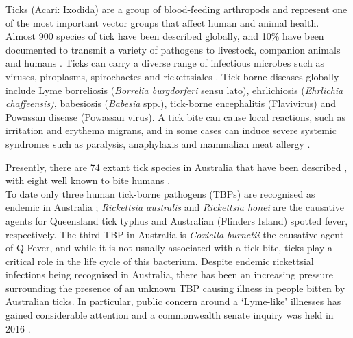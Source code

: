 \documentclass[a4paper, nobind]{templates/ociamthesis}
\begin{document}
\nocite{guglielmoneIxodidaeAcariIxodoidea2020}
\nocite{lohIdentificationTheileriaFuliginosalike2018}
\nocite{cooperDetectionCoxiellaBurnetii2013} \nocite{greayIlluminatingBacterialMicrobiome2021} \nocite{brodyCaseTickTyphus1946} \nocite{popeIsolationRickettsiaResembling1955} \nocite{owenDetectionIdentificationNovel2006} \nocite{owenPotentiallyPathogenicSpotted2006} \nocite{sentausaGenomeSequenceRickettsia2013} \nocite{liHighPrevalenceRickettsia2010} \nocite{abdadRickettsiaGravesiiSp2017} \nocite{owenDetectionCharacterisationRickettsiae2007} \nocite{bennettCoxiellaBurnetiiWestern2011}
\nocite{jefferiesTwoSpeciesCanine2003}
\nocite{jonssonProductivityHealthEffects2008}
\nocite{angusHistoryCattleTick1996}

Ticks (Acari: Ixodida) are a group of blood-feeding arthropods and represent one of the most important vector groups that affect human and animal health. Almost 900 species of tick have been described globally, and 10\% have been documented to transmit a variety of pathogens to livestock, companion animals and humans \autocite{jongejanGlobalImportanceTicks2004}.
Ticks can carry a diverse range of infectious microbes such as viruses, piroplasms, spirochaetes and rickettsiales \autocite{pfaffleEcologyTickborneDiseases2013}.
Tick-borne diseases globally include Lyme borreliosis (\emph{Borrelia burgdorferi} sensu lato), ehrlichiosis (\emph{Ehrlichia chaffeensis)}, babesiosis (\emph{Babesia} spp.), tick-borne encephalitis (Flavivirus) and Powassan disease (Powassan virus).
A tick bite can cause local reactions, such as irritation and erythema migrans, and in some cases can induce severe systemic syndromes such as paralysis, anaphylaxis and mammalian meat allergy \autocite{vannunenTickinducedAllergiesMammalian2015,beamanNoninfectiousIllnessTick2018,pienaarTickParalysisSolving2018}.

Presently, there are 74 extant tick species in Australia that have been described \autocite{barkerList70Species2014,ashMorphologicalMolecularDescription2017,heathNewSpeciesTick2017,kwakIxodesHeathiSp2018,barkerIxodesBarkeriSp2019}, with eight well known to bite humans \autocite{barkerTicksAustraliaSpecies2014}.\\
To date only three human tick-borne pathogens (TBPs) are recognised as endemic in Australia \autocite{gravesTickborneInfectiousDiseases2017}; \emph{Rickettsia australis} and \emph{Rickettsia honei} are the causative agents for Queensland tick typhus and Australian (Flinders Island) spotted fever, respectively.
The third TBP in Australia is \emph{Coxiella burnetii} the causative agent of Q Fever, and while it is not usually associated with a tick-bite, ticks play a critical role in the life cycle of this bacterium.
Despite endemic rickettsial infections being recognised in Australia, there has been an increasing pressure surrounding the presence of an unknown TBP causing illness in people bitten by Australian ticks.
In particular, public concern around a `Lyme-like' illnesses has gained considerable attention and a commonwealth senate inquiry was held in 2016 \autocite{radcliffeGrowingEvidenceEmerging2016}.
\end{document}
